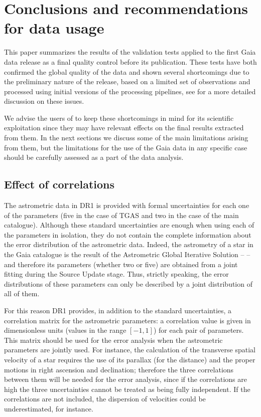\section{Conclusions and recommendations for data usage}\label{sec:conclusions}

This paper summarizes the results of the validation tests applied to the
first Gaia data release as a final 
quality control before its publication. These tests have both 
confirmed the global quality of the data and shown several shortcomings
due to the preliminary nature of the release, based on a 
limited set of observations and processed using initial 
versions of the processing pipelines, see 
\citet{DPACP-14,DPACP-12,DPACP-8}
for a more detailed discussion on these issues.

We advise the users of {} to keep these shortcomings
in mind for its scientific exploitation since they may
have relevant effects on the final results extracted from
them. In the next sections we discuss some of the main
limitations arising from them, but the limitations
for the use of the Gaia data in any specific case
should be carefully assessed as a part of the data analysis.


\subsection{Effect of correlations}\label{sec:effect-correlations}

The astrometric data in DR1 is provided with formal uncertainties for each one of
the parameters (five in the case of TGAS and two in the case of the main
catalogue). Although these standard uncertainties are enough when using each
of the parameters in isolation, they do not contain the complete information 
about the error distribution of the astrometric data. Indeed, the astrometry
of a star in the Gaia catalogue is the result of the Astrometric Global 
Iterative Solution -- \cite{DPACP-14} -- and therefore its parameters
(whether two or five) are obtained from a joint fitting during the Source
Update stage. Thus, strictly speaking, the error distributions of these 
parameters can only be described by a joint distribution of all of them. 

For this reason DR1 provides, in addition to the standard uncertainties, a correlation
matrix for the astrometric parameters: a correlation value is given in
dimensionless units (values in the range $[-1,1]$) for each pair of 
parameters. This matrix should be used for the error analysis when the
astrometric parameters are jointly used. For instance, the calculation of the
transverse spatial velocity of a star requires the use of its parallax (for
the distance) and the proper motions in right ascension and declination; 
therefore the three correlations between them will be needed for the
error analysis, since if the correlations are high the three uncertainties cannot 
be treated as being fully independent. If the correlations are not
included, the dispersion of velocities could be underestimated, for 
instance.

